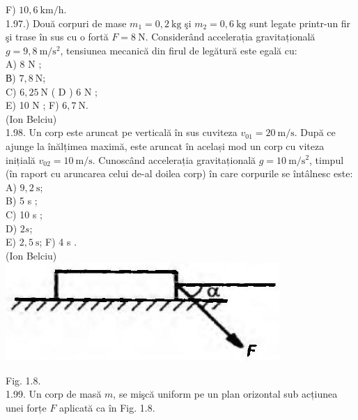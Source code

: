 \documentclass[10pt]{article}
\begin{document}
F) $10,6 \mathrm{~km} / \mathrm{h}$.\\
1.97.) Două corpuri de mase $m_{1}=0,2 \mathrm{~kg}$ şi $m_{2}=0,6 \mathrm{~kg}$ sunt legate printr-un fir şi trase în sus cu o fortă $F=8 \mathrm{~N}$. Considerând accelerația gravitațională $g=9,8 \mathrm{~m} / \mathrm{s}^{2}$, tensiunea mecanică din firul de legătură este egală cu:\\
A) 8 N ;\\
В) $7,8 \mathrm{~N}$;\\
C) $6,25 \mathrm{~N}$ ( D ) 6 N ;\\
E) 10 N ; F) $6,7 \mathrm{~N}$.\\
(Ion Belciu)\\
1.98. Un corp este aruncat pe verticală în sus cuviteza $v_{01}=20 \mathrm{~m} / \mathrm{s}$. După ce ajunge la înălțimea maximă, este aruncat în același mod un corp cu viteza inițială $v_{02}=10 \mathrm{~m} / \mathrm{s}$. Cunoscând accelerația gravitațională $g=10 \mathrm{~m} / \mathrm{s}^{2}$, timpul (în raport cu aruncarea celui de-al doilea corp) în care corpurile se întâlnesc este:\\
A) $9,2 \mathrm{~s}$;\\
B) 5 s ;\\
C) 10 s ;\\
D) $2 s$;\\
E) $2,5 \mathrm{~s}$; F) 4 s .\\
(Ion Belciu)\\
\includegraphics[max width=\textwidth, center]{2025_07_01_5b3ff9fa0d508c8e9f17g-024}

Fig. 1.8.\\
1.99. Un corp de masă $m$, se mişcă uniform pe un plan orizontal sub acțiunea unei forțe $F$ aplicată ca în Fig. 1.8.
\end{document}
